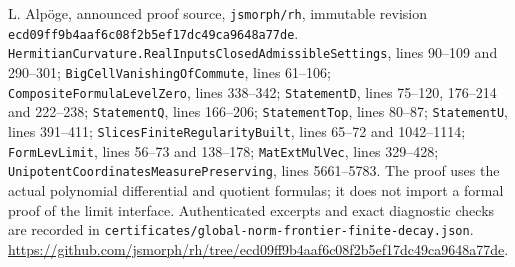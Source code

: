 L. Alp\"oge, announced proof source, \texttt{jsmorph/rh}, immutable
revision \texttt{ecd09ff9b4aaf6c08f2b5ef17dc49ca9648a77de}.
\texttt{HermitianCurvature.RealInputsClosedAdmissibleSettings},
lines 90--109 and 290--301;
\texttt{BigCellVanishingOfCommute}, lines 61--106;
\texttt{CompositeFormulaLevelZero}, lines 338--342;
\texttt{StatementD}, lines 75--120, 176--214 and 222--238;
\texttt{StatementQ}, lines 166--206;
\texttt{StatementTop}, lines 80--87;
\texttt{StatementU}, lines 391--411;
\texttt{SlicesFiniteRegularityBuilt}, lines 65--72 and 1042--1114;
\texttt{FormLevLimit}, lines 56--73 and 138--178;
\texttt{MatExtMulVec}, lines 329--428;
\texttt{UnipotentCoordinatesMeasurePreserving}, lines 5661--5783.
The proof uses the actual polynomial differential and quotient
formulas; it does not import a formal proof of the limit interface.
Authenticated excerpts and exact diagnostic checks are recorded in
\texttt{certificates/global-norm-frontier-finite-decay.json}.
\url{https://github.com/jsmorph/rh/tree/ecd09ff9b4aaf6c08f2b5ef17dc49ca9648a77de}.
